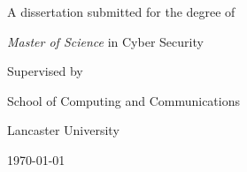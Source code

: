 \begin{titlepage}

\center

\huge  \textbf{\thesistitle}

\vfill

\vspace{1cm} %

\large \textbf{\authorname} \vspace{1mm}

\textbf{\authordegrees}

\vfill

A dissertation submitted for the degree of

\textit{Master of Science} in Cyber Security

\vfill

Supervised by \textit{\supervisor}

\vfill

School of Computing and Communications \vspace{1mm}

Lancaster University

\vfill

\monthyeardate\today

\end{titlepage}